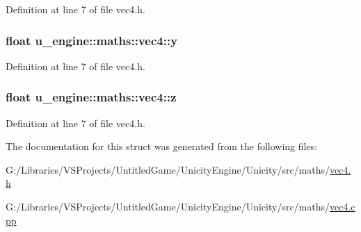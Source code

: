 Definition at line 7 of file vec4.\+h.

\hypertarget{structu__engine_1_1maths_1_1vec4_a6a927f4b26273d6edafc9dd1ae2ee6ff}{}
\subsubsection[{y}]{\setlength{\rightskip}{0pt plus 5cm}float u\+\_\+engine\+::maths\+::vec4\+::y}\label{structu__engine_1_1maths_1_1vec4_a6a927f4b26273d6edafc9dd1ae2ee6ff}


Definition at line 7 of file vec4.\+h.

\hypertarget{structu__engine_1_1maths_1_1vec4_aa4ee395d64d387a30ec6e46a6413c3a1}{}
\subsubsection[{z}]{\setlength{\rightskip}{0pt plus 5cm}float u\+\_\+engine\+::maths\+::vec4\+::z}\label{structu__engine_1_1maths_1_1vec4_aa4ee395d64d387a30ec6e46a6413c3a1}


Definition at line 7 of file vec4.\+h.



The documentation for this struct was generated from the following files\+:\begin{DoxyCompactItemize}
\item 
G\+:/\+Libraries/\+V\+S\+Projects/\+Untitled\+Game/\+Unicity\+Engine/\+Unicity/src/maths/\hyperlink{vec4_8h}{vec4.\+h}\item 
G\+:/\+Libraries/\+V\+S\+Projects/\+Untitled\+Game/\+Unicity\+Engine/\+Unicity/src/maths/\hyperlink{vec4_8cpp}{vec4.\+cpp}\end{DoxyCompactItemize}
